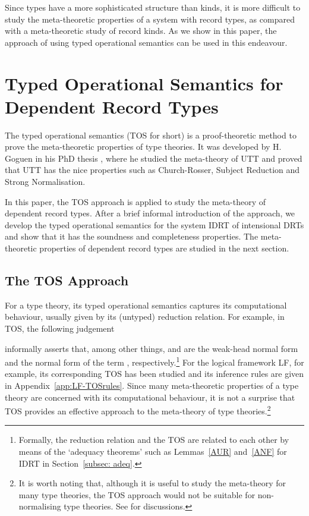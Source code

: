 \documentclass[submission,copyright,creativecommons]{eptcs}
\begin{document}
Since types have a more sophisticated structure than kinds, it is more difficult to study the meta-theoretic properties of a system with record types, as compared with a meta-theoretic study of record kinds.  As we show in this paper, the approach of using typed operational semantics can be used in this endeavour.



\section{Typed Operational Semantics for Dependent Record Types}
\label{sec:TOS}

The typed operational semantics (TOS for short) is a proof-theoretic method to prove the meta-theoretic properties of type theories.  It was developed by H. Goguen in his PhD thesis \cite{healf:thesis}, where he studied the meta-theory of UTT and proved that UTT has the nice properties such as Church-Rosser, Subject Reduction and Strong Normalisation.

In this paper, the TOS approach is applied to study the meta-theory of dependent record types.  After a brief informal introduction of the approach, we develop the typed operational semantics for the system IDRT of intensional DRTs and show that it has the soundness and completeness properties.  The meta-theoretic properties of dependent record types are studied in the next section.

\subsection{The TOS Approach}
\label{sec:introTOS}

For a type theory, its typed operational semantics captures its computational behaviour, usually given by its (untyped) reduction relation.  For example, in TOS, the following judgement

informally asserts that, among other things,  and  are the weak-head normal form and the normal form of the term , respectively.\footnote{Formally, the reduction relation and the TOS are related to each other by means of the `adequacy theorems' such as Lemmas~\ref{AUR} and~\ref{ANF} for IDRT in Section~\ref{subsec: adeq}.}  For the logical framework LF, for example, its corresponding TOS has been studied \cite{healf:TLCA99YY} and its inference rules are given in Appendix~\ref{app:LF-TOSrules}.  Since many meta-theoretic properties of a type theory are concerned with its computational behaviour, it is not a surprise that TOS provides an effective approach to the meta-theory of type theories.\footnote{It is worth noting that, although it is useful to study the meta-theory for many type theories, the TOS approach would not be suitable for non-normalising type theories.  See \cite{healf:thesis} for discussions.}
\end{document}
